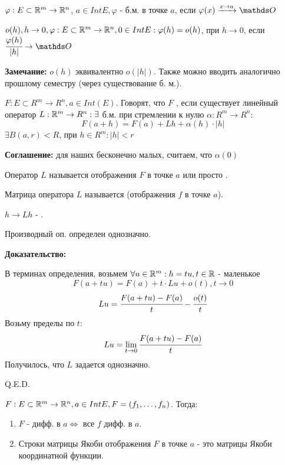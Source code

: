   $\varphi : E \subset \mathbb{R}^m \rightarrow \mathbb{R}^n$, $a \in Int E, \varphi$ - б.м. в точке $a$, если $\varphi(x)\xrightarrow{x \rightarrow a}\zero$

 $o(h), h \rightarrow 0, \varphi: E \subset \mathbb{R}^m \rightarrow \mathbb{R}^n, 0 \in Int E: \varphi(h) = o(h)$, при $h\rightarrow0$, если $\cfrac{\varphi(h)}{|h|}\rightarrow \zero$

\textbf{Замечание:} $o(h)$ эквивалентно $o(|h|)$. Также  можно вводить аналогично прошлому семестру (через существование б. м.).

 $F: E \subset R^m \rightarrow R^n, a \in Int(E)$.
Говорят, что $F$ , если существует линейный оператор $L:\mathbb{R}^m\rightarrow R^n: \exists$ б.м. при стремлении к нулю $\alpha : R^m\rightarrow R^n$:
$$F(a+h) = F(a)+L h + \alpha(h) \cdot |h| $$
$\exists B(a,r) < R$, при $h\in R^m: |h|<r$

\textbf{Соглашение:} для наших бесконечно малых, считаем, что $\alpha(0)$

 Оператор $L$ называется  отображения $F$ в точке $a$ или просто .

 Матрица оператора $L$ называется  (отображения $f$ в точке $a$).

 $h \rightarrow Lh$ - .


Производный оп. определен однозначно.

\textbf{Доказательство:}

В терминах определения, возьмем $\forall u \in \mathbb{R}^m: h =tu, t \in \mathbb{R}$ - маленькое
$$F(a + tu) = F(a) + t \cdot Lu +o(t), t \rightarrow 0 $$
$$Lu = \cfrac{F(a+tu) - F(a)}{t} - \cfrac{o(t)}{t}$$
Возьму пределы по $t$:
$$Lu = \lim\limits_{t \rightarrow 0}\cfrac{F(a+tu) - F(a)}{t}$$
Получилось, что $L$ задается однозначно.

\hfill Q.E.D.


$F : E \subset \mathbb{R}^m \rightarrow \mathbb{R}^n, a \in Int E, F = (f_1,\ldots,f_n)$. Тогда:
\begin{enumerate}
    \item $F$ - дифф. в $a \Leftrightarrow$ все $f$ дифф. в $a$.
    \item Строки матрицы Якоби отображения $F$ в точке $a$ - это матрицы Якоби координатной функции.
\end{enumerate}

